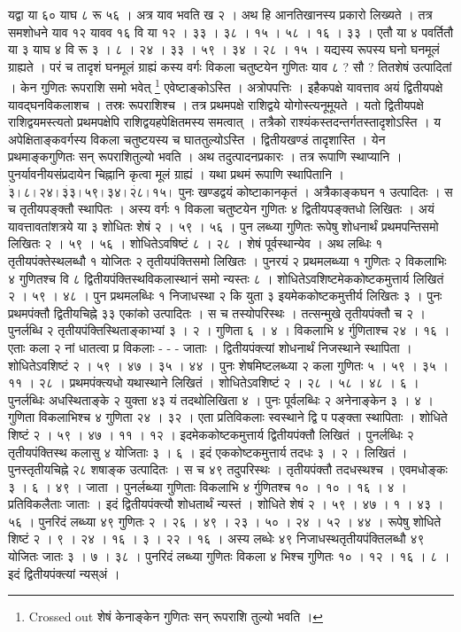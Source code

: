 \documentclass[11pt,a5paper]{book}
\begin{document}
{\newpage
{\s यद्वा या ६० याघ ८ रू ५६ । अत्र याव भवति ख २ । 
अथ हि आनतिखानस्य प्रकारो लिख्यते । तत्र समशोधने याव १२ यावव १६ वि या १२ । ३३ । ३८ । १५ । ५८ । १६ । ३३ । 
एतौ या ४ पवर्तितौ या ३ याघ ४ वि रू ३ । ८ । २४ । ३३ । ५९ । ३४ । २८ । १५ । 
यद्यस्य रूपस्य घनो घनमूलं ग्राह्यते । परं च तादृशं घनमूलं ग्राह्यं कस्य वर्गः विकला चतुष्टयेन गुणितः याव ८ ? सौ ? 
तितशेषं उत्पादितां । केन गुणितः रूपराशि समो भवेत् \footnote{Crossed out शेषं केनाङ्केन गुणितः सन् रूपराशि तुल्यो भवति ।} 
एवेष्टाङ्कोऽस्ति । अत्रोपपत्तिः । इहैकपक्षे यावत्ताव अयं द्वितीयपक्षे यावद्घनविकलाशच । 
तस्रः रूपराशिश्च । तत्र प्रथमपक्षे राशिद्वये योगोस्त्यनूमूयते । यतो द्वितीयपक्षे राशिद्वयमस्त्यतो प्रथमपक्षेपि राशिद्वयहपेक्षितमस्य समत्वात् । 
तत्रैको राश्यंकस्तदन्तर्गतस्तादृशोऽस्ति । य अपेक्षिताङ्कवर्गस्य विकला चतुष्टयस्य च घाततुल्योऽस्ति । 
द्वितीयखण्डं तादृशास्ति । येन प्रथमाङ्कगुणितः सन् रूपराशितुल्यो भवति । 
अथ तदुत्पादनप्रकारः । तत्र रूपाणि स्थाप्यानि । पुनर्यावनीयसंप्रदायेन चिह्नानि कृत्वा मूलं ग्राह्यं । 
यथा प्रथमं रूपाणि स्थापितानि । $\dot{३} । ८ । २४ । \dot{३३} । ५९ । ३४ । \dot{२८} । १५ ।$ 
पुनः खण्डद्वयं कोष्टाकानकृतं । अत्रैकाङ्कघन १ उत्पादितः । स च तृतीयपङ्क्तौ स्थापितः । 
अस्य वर्गः १ विकला चतुष्टयेन गुणितः ४ द्वितीयपङ्क्तधो लिखितः । 
अयं यावत्तावतांशत्रये या ३ शोधितः शेषं २ । ५९ । ५६ । 
पुन लब्ध्या गुणितः रूपेषु शोधनार्थं प्रथमपन्तिसमो लिखितः २ । ५९ । ५६ । 
शोधितेऽवषिष्टं ८ । २८ । शेषं पूर्वस्थान्येव । अथ लब्धिः १ तृतीयपंक्तेस्थलब्धौ १ योजितः २ तृतीयपंक्तिसमो लिखितः । 
पुनरयं २ प्रथमलब्ध्या १ गुणितः २ विकलाभिः ४ गुणितश्च  वि ८ द्वितीयपंक्तिस्थविकलास्थानं समो न्यस्तः ८ । 
शोधितेऽवशिष्टमेककोष्टकमुत्तार्य लिखितं २ । ५९ । ४८ । पुन प्रथमलब्धिः १ निजाधस्था २ कि युता ३ इयमेककोष्टकमुत्तीर्य लिखितः ३ । 
पुनः प्रथमपंक्तौ द्वितीयचिह्ने ३३ एकांको उत्पादितः । स च तस्योपरिस्थः । तत्सन्मुखे तृतीयपंक्तौ च २ । 
पुनर्लब्धि २ तृतीयपंक्तिस्थिताङ्काभ्यां ३ । २ । गुणिता ६ । ४ । विकलाभि ४ र्गुणिताश्च २४ । १६ । 
एताः कला २ नां धातत्वा प्र विकलाः - - - जाताः । द्वितीयपंक्त्यां शोधनार्थं निजस्थाने स्थापिता । 
शोधितेऽवशिष्टं २ । ५९ । ४७ । ३५ । ४४ । पुनः शेषमिष्टलब्ध्या २ कला गुणितः ५ । ५९ । ३५ । ११ । २८ । 
प्रथमपंक्त्यधो यथास्थाने लिखितं । शोधितेऽवशिष्टं २ । २८ । ५८ । ४८ । ६ । 
पुनर्लब्धिः अधस्थिताङ्के २ युक्ता ४३ यं तदथोलिखिता ४ । पुनः पूर्वलब्धिः २ अनेनाङ्केन ३ । ४ । 
गुणिता विकलाभिश्च ४ गुणिता २४ । ३२ । एता प्रतिविकलाः स्वस्थाने द्वि प पङ्क्ता स्थापिताः । 
शोधिते शिष्टं २ । ५९ । ४७ । ११ । १२ । इदमेककोष्टकमुत्तार्य द्वितीयपंक्तौ लिखितं । 
पुनर्लब्धिः २ तृतीयपंक्तिस्थ कलासु ४ योजिताः ३ । ६ । इदं एककोष्टकमुत्तार्य तदधः ३ । २ । 
लिखितं । पुनस्तृतीयचिह्ने २८ शषाङ्क उत्पादितः । स च ४९ तदुपरिस्थः । 
तृतीयपंक्तौ तदधस्थश्च । एवमधोङ्कः ३ । ६ । ४९ । जाता । पुनर्लब्ध्या गुणिताः विकलाभि ४ र्गुणितश्च १० । १० । १६ । ४ । 
प्रतिविकलैताः जाताः । इदं द्वितीयपंक्त्यौ शोधतार्थं न्यस्तं । शोधिते शेषं २ । ५९ । ४७ । १ । ४३ । ५६ । 
पुनरिदं लब्ध्या ४९ गुणितः २ । २६ । ४९ । २३ । ५० । २४ । ५२ । ४४ । 
रूपेषु शोधिते शिष्टं २ । ९ । २४ । १६ । ३ । २२ । १६ । अस्य लब्धेः ४९ निजाधस्थतृतीयपंक्तिलब्धौ ४९ योजितः जातः ३ । ७ । ३८ । 
पुनरिदं लब्ध्या गुणितः विकला ४ भिश्च गुणितः १० । १२ । १६ । ८ । इदं द्वितीयपंक्त्यां न्यस्अं । 




}}
\end{document}
